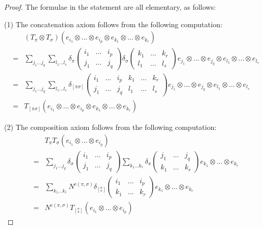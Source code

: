 \documentclass[12pt]{amsbook}
\begin{document}
\begin{proof}
The formulae in the statement are all elementary, as follows:

\medskip

(1) The concatenation axiom follows from the following computation:
\begin{eqnarray*}
&&(T_\pi\otimes T_\sigma)(e_{i_1}\otimes\ldots\otimes e_{i_p}\otimes e_{k_1}\otimes\ldots\otimes e_{k_r})\\
&=&\sum_{j_1\ldots j_q}\sum_{l_1\ldots l_s}\delta_\pi\begin{pmatrix}i_1&\ldots&i_p\\j_1&\ldots&j_q\end{pmatrix}\delta_\sigma\begin{pmatrix}k_1&\ldots&k_r\\l_1&\ldots&l_s\end{pmatrix}e_{j_1}\otimes\ldots\otimes e_{j_q}\otimes e_{l_1}\otimes\ldots\otimes e_{l_s}\\
&=&\sum_{j_1\ldots j_q}\sum_{l_1\ldots l_s}\delta_{[\pi\sigma]}\begin{pmatrix}i_1&\ldots&i_p&k_1&\ldots&k_r\\j_1&\ldots&j_q&l_1&\ldots&l_s\end{pmatrix}e_{j_1}\otimes\ldots\otimes e_{j_q}\otimes e_{l_1}\otimes\ldots\otimes e_{l_s}\\
&=&T_{[\pi\sigma]}(e_{i_1}\otimes\ldots\otimes e_{i_p}\otimes e_{k_1}\otimes\ldots\otimes e_{k_r})
\end{eqnarray*}

(2) The composition axiom follows from the following computation:
\begin{eqnarray*}
&&T_\pi T_\sigma(e_{i_1}\otimes\ldots\otimes e_{i_p})\\
&=&\sum_{j_1\ldots j_q}\delta_\sigma\begin{pmatrix}i_1&\ldots&i_p\\j_1&\ldots&j_q\end{pmatrix}
\sum_{k_1\ldots k_r}\delta_\pi\begin{pmatrix}j_1&\ldots&j_q\\k_1&\ldots&k_r\end{pmatrix}e_{k_1}\otimes\ldots\otimes e_{k_r}\\
&=&\sum_{k_1\ldots k_r}N^{c(\pi,\sigma)}\delta_{[^\sigma_\pi]}\begin{pmatrix}i_1&\ldots&i_p\\k_1&\ldots&k_r\end{pmatrix}e_{k_1}\otimes\ldots\otimes e_{k_r}\\
&=&N^{c(\pi,\sigma)}T_{[^\sigma_\pi]}(e_{i_1}\otimes\ldots\otimes e_{i_p})
\end{eqnarray*}


\end{proof}
\end{document}
